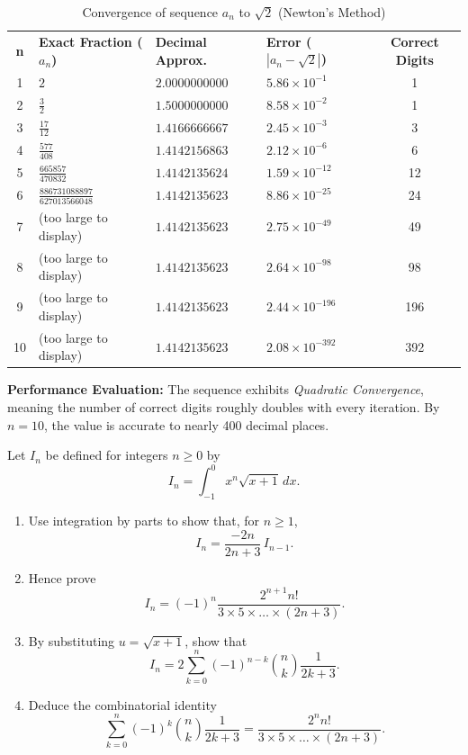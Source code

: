 \begin{table}[h!]
\centering
\caption{Convergence of sequence $a_n$ to $\sqrt{2}$ (Newton's Method)}
\label{tab:newton_convergence}
\renewcommand{\arraystretch}{1.2}
\begin{tabular}{@{}c l l l c@{}}
\textbf{n} & \textbf{Exact Fraction ($a_n$)} & \textbf{Decimal Approx.} & \textbf{Error ($|a_n - \sqrt{2}|$)} & \textbf{Correct Digits} \\
1 & $2$ & $2.0000000000$ & $5.86 \times 10^{-1}$ & 1 \\
2 & $\frac{3}{2}$ & $1.5000000000$ & $8.58 \times 10^{-2}$ & 1 \\
3 & $\frac{17}{12}$ & $1.4166666667$ & $2.45 \times 10^{-3}$ & 3 \\
4 & $\frac{577}{408}$ & $1.4142156863$ & $2.12 \times 10^{-6}$ & 6 \\
5 & $\frac{665857}{470832}$ & $1.4142135624$ & $1.59 \times 10^{-12}$ & 12 \\
6 & $\frac{886731088897}{627013566048}$ & $1.4142135623$ & $8.86 \times 10^{-25}$ & 24 \\
7 & (too large to display) & $1.4142135623$ & $2.75 \times 10^{-49}$ & 49 \\
8 & (too large to display) & $1.4142135623$ & $2.64 \times 10^{-98}$ & 98 \\
9 & (too large to display) & $1.4142135623$ & $2.44 \times 10^{-196}$ & 196 \\
10 & (too large to display) & $1.4142135623$ & $2.08 \times 10^{-392}$ & 392 \\
\end{tabular}

\vspace{0.3cm}
\small \textbf{Performance Evaluation:} The sequence exhibits \textit{Quadratic Convergence}, meaning the number of correct digits roughly doubles with every iteration. By $n=10$, the value is accurate to nearly 400 decimal places.
\end{table}

\begin{problem}\label{prob:part2-integral-identity-06}
Let $I_n$ be defined for integers $n\ge0$ by
\[
I_n=\int_{-1}^0 x^n\sqrt{x+1}\,dx.
\]
\begin{enumerate}[label=(\roman*)]
    \item Use integration by parts to show that, for $n\ge1$,
    \[I_n=\frac{-2n}{2n+3}\,I_{n-1}.
    \]
    \item Hence prove
    \[I_n = (-1)^n\frac{2^{n+1}n!}{3\times5\times\dots\times(2n+3)}.
    \]
    \item By substituting $u=\sqrt{x+1}$, show that
    \[I_n = 2\sum_{k=0}^n (-1)^{n-k}\binom{n}{k}\frac{1}{2k+3}.
    \]
    \item Deduce the combinatorial identity
    \[\sum_{k=0}^n (-1)^k \binom{n}{k}\frac{1}{2k+3} = \frac{2^n n!}{3\times5\times\dots\times(2n+3)}.
    \]
\end{enumerate}
\end{problem}

